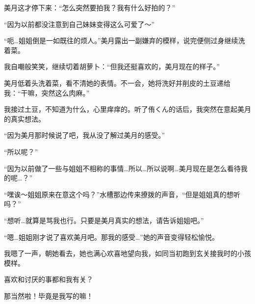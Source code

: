 美月这才停下来：“怎么突然要拍我？我有什么好拍的？”

“因为以前都没注意到自己妹妹变得这么可爱了～”

“呃…姐姐倒是一如既往的烦人。”美月露出一副嫌弃的模样，说完便侧过身继续洗着菜。

我自嘲般笑笑，继续切着胡萝卜：“但我还挺喜欢的，美月现在的样子。”

美月低着头洗着菜，看不清她的表情。不一会，她将洗好并削皮的土豆递给我：“干嘛，突然这么肉麻。”

我接过土豆，不知道为什么，心里痒痒的。听了侑くん的话后，我突然在意起美月的真实想法。

“因为美月那时候说了吧，我从没了解过美月的感受。”

“所以呢？”

“因为以前做了一些与姐姐不相称的事情…所以…所以说啊…美月现在是怎么看待我的呢…？”

“嘿诶～姐姐原来在意这个吗？”水槽那边传来撩拨的声音，“但是姐姐真的想听吗？”

“想听…就算是骂我也行。只要是美月真实的想法，请告诉姐姐吧。”

“嗯…姐姐刚才说了喜欢美月吧。那我的感受…”她的声音变得轻松愉悦。

我嗯了一声，朝她看去，她也满心欢喜地望向我，如同当初跑到玄关接我时的小孩模样。


\newpage


\newday{\sunny}


{
	喜欢和讨厌的事都和我有关？
	
	那当然啦！毕竟是我写的嘛！
}


\newpage



